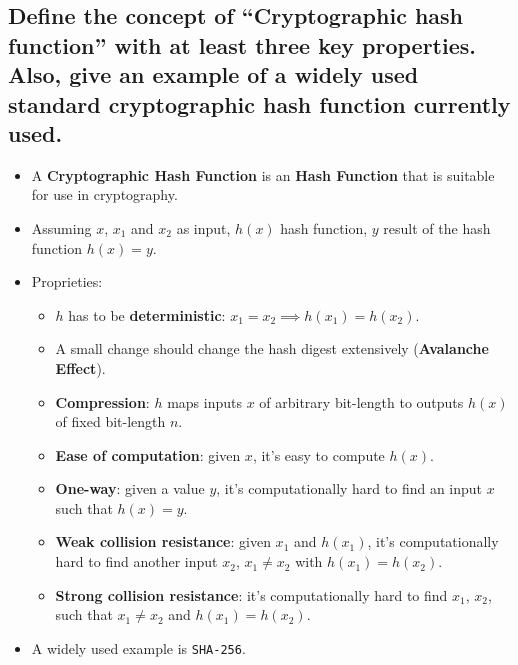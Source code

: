 \documentclass[9pt, letterpaper]{article}
\begin{document}
\subsection{Define the concept of “Cryptographic hash function” with at least three key properties. Also, give an example of a widely used standard cryptographic hash function currently used.}
\begin{itemize}
	\item A \textbf{Cryptographic Hash Function} is an \textbf{Hash Function} that is suitable for use in cryptography.
	\item Assuming $x$, $x_1$ and $x_2$ as input, $h(x)$ hash function, $y$ result of the hash function $h(x)=y$.
	\item Proprieties:
	\begin{itemize}
	\item $h$ has to be \textbf{deterministic}: $x_1=x_2 \implies h(x_1)=h(x_2)$.
	\item A small change should change the hash digest extensively (\textbf{Avalanche Effect}).
	\item \textbf{Compression}: $h$ maps inputs $x$ of arbitrary bit-length to outputs $h(x)$ of fixed bit-length $n$.
	\item \textbf{Ease of computation}: given $x$, it's easy to compute $h(x)$.
	\item \textbf{One-way}: given a value $y$, it's computationally hard to find an input $x$ such that $h(x)=y$.
	\item \textbf{Weak collision resistance}: given $x_1$ and $h(x_1)$, it's computationally hard to find another input $x_2$, $x_1\ne x_2$ with $h(x_1)=h(x_2)$.
	\item \textbf{Strong collision resistance}: it's computationally hard to find $x_1$, $x_2$, such that $x_1\ne x_2$ and $h(x_1)=h(x_2)$.
	\end{itemize}
	\item A widely used example is {\tt SHA-256}.
\end{itemize}
\end{document}
